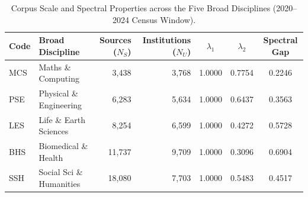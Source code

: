 \begin{table}[htbp]
\centering
\small
\caption{Corpus Scale and Spectral Properties across the Five Broad Disciplines (2020--2024 Census Window).}
\label{tab:corpus_summary}
\begin{tabularx}{\textwidth}{l >{\raggedright\arraybackslash}X r r ccc}
\toprule
\textbf{Code} & \textbf{Broad Discipline} & \textbf{Sources ($N_S$)} & \textbf{Institutions ($N_U$)} & $\lambda_1$ & $\lambda_2$ & \textbf{Spectral Gap} \\
\midrule
MCS & Maths \& Computing & 3,438 & 3,768 & 1.0000 & 0.7754 & 0.2246 \\
PSE & Physical \& Engineering & 6,283 & 5,634 & 1.0000 & 0.6437 & 0.3563 \\
LES & Life \& Earth Sciences & 8,254 & 6,599 & 1.0000 & 0.4272 & 0.5728 \\
BHS & Biomedical \& Health & 11,737 & 9,709 & 1.0000 & 0.3096 & 0.6904 \\
SSH & Social Sci \& Humanities & 18,080 & 7,703 & 1.0000 & 0.5483 & 0.4517 \\
\bottomrule
\end{tabularx}
\end{table}
